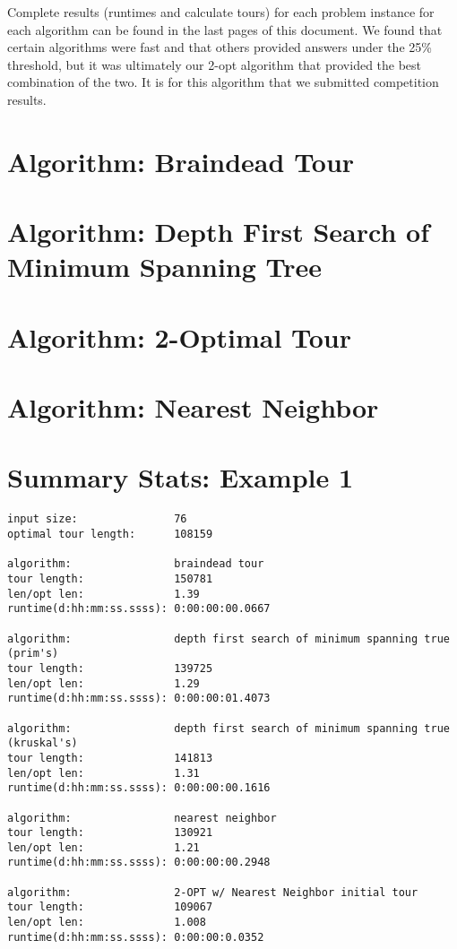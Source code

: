 \documentclass[12pt]{article}
\begin{document}
Complete results (runtimes and calculate tours) for each problem instance for each algorithm can be found in the last pages of this document.  We found that certain algorithms were fast and that others provided answers under the 25\% threshold, but it was ultimately our 2-opt algorithm that provided the best combination of the two.  It is for this algorithm that we submitted competition results.

\newpage
\section*{Algorithm: Braindead Tour}


\newpage
\section*{Algorithm: Depth First Search of Minimum Spanning Tree}


\newpage
\section*{Algorithm: 2-Optimal Tour}


\newpage
\section*{Algorithm: Nearest Neighbor}


\newpage
\section*{Summary Stats: Example 1}
\begin{verbatim}
input size:               76
optimal tour length:      108159

algorithm:                braindead tour
tour length:              150781
len/opt len:              1.39
runtime(d:hh:mm:ss.ssss): 0:00:00:00.0667

algorithm:                depth first search of minimum spanning true (prim's) 
tour length:              139725
len/opt len:              1.29
runtime(d:hh:mm:ss.ssss): 0:00:00:01.4073

algorithm:                depth first search of minimum spanning true (kruskal's) 
tour length:              141813
len/opt len:              1.31
runtime(d:hh:mm:ss.ssss): 0:00:00:00.1616

algorithm:                nearest neighbor 
tour length:              130921
len/opt len:              1.21
runtime(d:hh:mm:ss.ssss): 0:00:00:00.2948

algorithm:                2-OPT w/ Nearest Neighbor initial tour
tour length:              109067
len/opt len:              1.008
runtime(d:hh:mm:ss.ssss): 0:00:00:0.0352
\end{verbatim}
\end{document}

